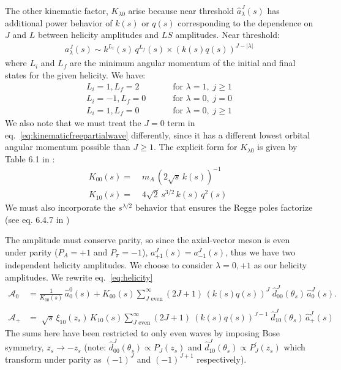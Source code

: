 \documentclass[aps,prd,amsmath,amssymb,superscriptaddress,onecolumn,
nofootinbib,showpacs,preprintnumbers]{revtex4-1}
\begin{document}
The other kinematic factor, \(K_{\lambda0}\) arise  because near threshold \(\hat{a}_\lambda^J(s)\) has additional power behavior of \(k(s)\) or \(q(s)\) corresponding to the dependence on \(J\) and \(L\) between helicity amplitudes and \(LS\) amplitudes. Near threshold:
  \begin{gather}
    a^J_\lambda(s) \sim k^{L_i}(s) \, q^{L_f}(s) \times (k(s)q(s))^{J- |\lambda|}
  \end{gather}
where \(L_i\) and \(L_f\) are the minimum angular momentum of the initial and final states for the given helicity. We have:
  \begin{align}
      L_i = 1 , L_f = 2& \qquad  \text{ for } \lambda = 1, \; j \geq 1 \nonumber \\
      L_i = -1, L_f = 0 &\qquad  \text{ for } \lambda = 0, \; j = 0 \nonumber \\
      L_i = 1, L_f = 0 &\qquad  \text{ for } \lambda = 0, \;  j  \geq 1 \nonumber
  \end{align}
We also note that we must treat the \(J=0\) term in eq.~\ref{eq:kinematicfreepartialwave} differently, since it has a different lowest orbital angular momentum possible than \(J\geq 1\). The explicit form for \(K_{\lambda0}\) is given by Table 6.1 in \cite{Collins}:
  \begin{align}
    \label{eq:k-factor}
    K_{00 }(s) =& \; m_A \, ( 2\sqrt{s} \, k(s))^{-1}\\ \nonumber
    K_{10}(s) =& \; 4 \sqrt{2} \,  s^{3/2} \, k(s) \, q^2(s)  \;
  \end{align}
We must also incorporate the \(s^{\lambda/2}\) behavior that ensures the Regge poles factorize (see eq. 6.4.7 in \cite{Collins})

The amplitude must conserve parity, so since the axial-vector meson is even under parity (\( P_A = +1\) and \(P_\pi = -1\)), \(a_{+1}^J(s) = a_{-1}^J(s)\), thus we have two independent helicity amplitudes. We choose to consider \(\lambda = 0, +1\) as our helicity amplitudes.
We rewrite eq.~\ref{eq:helicity}
  \begin{align}
    \label{eq:model-helicity}
    \mathcal{A}_0 &= \frac{1}{K_{00}(s)} \, \hat{a}^0_0(s) + K_{00}(s) \sum_{J \text{ even}}^\infty (2J+1) \, (k(s)q(s))^J \; \hat{d}_{00}^J(\theta_s) \, \hat{a}^J_0(s). \\
    \nonumber \\
    \mathcal{A}_+ &= \; \sqrt{s} \, \xi_{10}(z_s) \, K_{10}(s) \sum_{J \text{ even}}^\infty (2J+1) \ (k(s)q(s))^{J-1} \;  \hat{d}_{10}^J(\theta_s) \, \hat{a}^J_+(s)
  \end{align}
The sums here have been restricted to only even waves by imposing Bose symmetry, \( z_s \to - z_s\) (note: \(\hat{d}^J_{00}(\theta_s) \propto P_J(z_s)\) and \(\hat{d}^J_{10}(\theta_s) \propto P^\prime_J(z_s)\) which transform under parity as \((-1)^J\) and \((-1)^{J+1}\) respectively).
\end{document}
